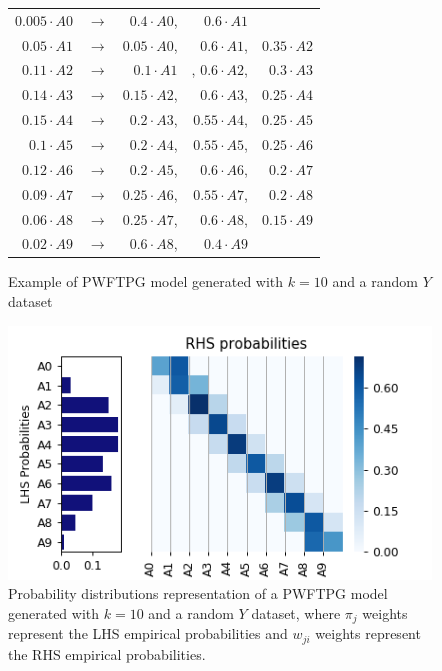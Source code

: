 \begin{figure}[htb]
    \centering
    \begin{tabular}{rcrrr}
        $0.005\cdot A0$ & $\rightarrow$ & $0.4\cdot A0$, & $0.6\cdot A1$ &   \\
        $0.05\cdot A1$ & $\rightarrow$ & $0.05\cdot A0$, & $0.6\cdot A1$, & $0.35\cdot A2$  \\
        $0.11\cdot A2$ & $\rightarrow$ & $0.1\cdot A1$&,  $0.6\cdot A2$, & $0.3\cdot A3$  \\
        $0.14\cdot A3$ & $\rightarrow$ & $0.15\cdot A2$, & $0.6\cdot A3$, & $0.25\cdot A4$  \\
        $0.15\cdot A4$ & $\rightarrow$ & $0.2\cdot A3$, & $0.55\cdot A4$, & $0.25\cdot A5$  \\
        $0.1\cdot A5$ & $\rightarrow$ & $0.2\cdot A4$, & $0.55\cdot A5$, & $0.25\cdot A6$  \\
        $0.12\cdot A6$ & $\rightarrow$ & $0.2\cdot A5$, & $0.6\cdot A6$, & $0.2\cdot A7$  \\
        $0.09\cdot A7$ & $\rightarrow$ & $0.25\cdot A6$, & $0.55\cdot A7$, & $0.2\cdot A8$  \\
        $0.06\cdot A8$ & $\rightarrow$ & $0.25\cdot A7$, & $0.6\cdot A8$, & $0.15\cdot A9$  \\
        $0.02\cdot A9$ & $\rightarrow$ & $0.6\cdot A8$, & $0.4\cdot A9$ &   \\
    \end{tabular}
    \caption{Example of PWFTPG model generated with $k=10$ and a random $Y$ dataset}
    \label{fig:pwftpg}
\end{figure}

\begin{figure}[htb]
    \centering
    \includegraphics{figures/pwfts_rules_firstorder.png}
    \caption{Probability distributions representation of a PWFTPG model generated with $k=10$ and a random $Y$ dataset, where $\pi_j$ weights represent the LHS empirical probabilities and $w_{ji}$ weights represent the RHS empirical probabilities.}
    \label{fig:pwfts_rules_firstorder}
\end{figure}

